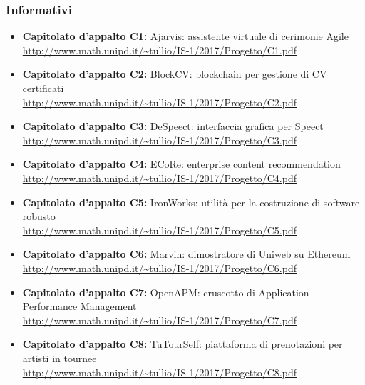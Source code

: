 		\subsubsection{Informativi}
		\begin{itemize}
 			\item \textbf{Capitolato d'appalto C1:} Ajarvis: assistente virtuale di cerimonie Agile \\ \url{http://www.math.unipd.it/~tullio/IS-1/2017/Progetto/C1.pdf}
 			\item \textbf{Capitolato d'appalto C2:} BlockCV: blockchain per gestione di CV certificati \\ \url{http://www.math.unipd.it/~tullio/IS-1/2017/Progetto/C2.pdf}
 			\item \textbf{Capitolato d'appalto C3:} DeSpeect: interfaccia grafica per Speect \\ \url{http://www.math.unipd.it/~tullio/IS-1/2017/Progetto/C3.pdf}
 			\item \textbf{Capitolato d'appalto C4:} ECoRe: enterprise content recommendation \\ \url{http://www.math.unipd.it/~tullio/IS-1/2017/Progetto/C4.pdf}
 			\item \textbf{Capitolato d'appalto C5:} IronWorks: utilità per la costruzione di software robusto \\ \url{http://www.math.unipd.it/~tullio/IS-1/2017/Progetto/C5.pdf}
 			\item \textbf{Capitolato d'appalto C6:} Marvin: dimostratore di Uniweb su Ethereum \\ \url{http://www.math.unipd.it/~tullio/IS-1/2017/Progetto/C6.pdf}
 			\item \textbf{Capitolato d'appalto C7:} OpenAPM: cruscotto di Application Performance Management \\ \url{http://www.math.unipd.it/~tullio/IS-1/2017/Progetto/C7.pdf}
 			\item \textbf{Capitolato d'appalto C8:} TuTourSelf: piattaforma di prenotazioni per artisti in tournee \\ \url{http://www.math.unipd.it/~tullio/IS-1/2017/Progetto/C8.pdf}
 			
		\end{itemize}
		



